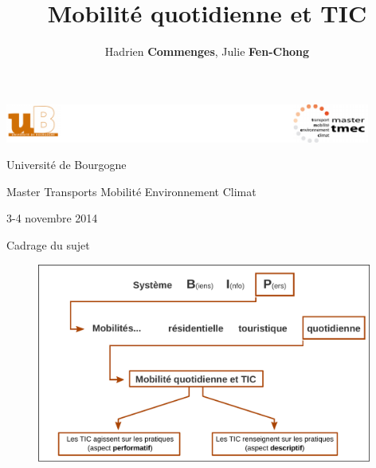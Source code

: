\documentclass{beamer}
\title{Mobilité quotidienne et TIC}
\author{Hadrien \textbf{Commenges}, Julie \textbf{Fen-Chong}}
\date{}
\begin{document}
\begin{frame}

\includegraphics[width=12cm]{Logos.pdf}

\vspace*{1cm}

\titlepage

\begin{center}
{\small
Université de Bourgogne

\vspace*{0.1cm}

Master Transports Mobilité Environnement Climat

\vspace*{0.1cm}

3-4 novembre 2014}

\end{center}

\end{frame}


\begin{frame}{Cadrage du sujet}

\begin{figure}
  \includegraphics[width=11cm]{Cadrage.pdf}
\end{figure}

\end{frame}
\end{document}
